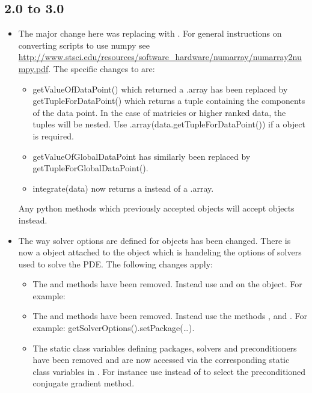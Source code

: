 \subsection*{2.0 to 3.0}
\begin{itemize}
\item The major change here was replacing  with \numpy.
For general instructions on converting scripts to use numpy see \url{http://www.stsci.edu/resources/software_hardware/numarray/numarray2numpy.pdf}.
The specific changes to \escript are:
\begin{itemize}
  \item getValueOfDataPoint() which returned a .array has been replaced by
 getTupleForDataPoint() which returns a \PYTHON tuple containing
the components of the data point. In the case of matricies or higher ranked data, the tuples will be nested. Use 
\numpy.array(data.getTupleForDataPoint()) if a \numpyNDA object is required.
 \item getValueOfGlobalDataPoint has similarly been replaced by getTupleForGlobalDataPoint().
 \item integrate(data) now returns a \numpyNDA instead of a .array.
\end{itemize}
Any python methods which previously accepted  objects will accept \numpy objects instead.

\item
The way solver options are defined for \LinearPDE objects has been changed. There is now a \SolverOptions object attached to the \LinearPDE object which is handeling the options of solvers used to solve the PDE. The following changes apply:  
\begin{itemize}
\item The  and  methods have been removed. Instead use
 and  on the \SolverOptions object.
For example:  


\item The  and  methods have been removed.
Instead use the methods ,  and .
For example: getSolverOptions().setPackage(\ldots).

\item The static class variables defining packages, solvers and preconditioners have been removed and are now accessed via the corresponding  static class variables in \SolverOptions. For instance use  instead of 
 to select the preconditioned conjugate gradient method.


\end{itemize}
\end{itemize}
